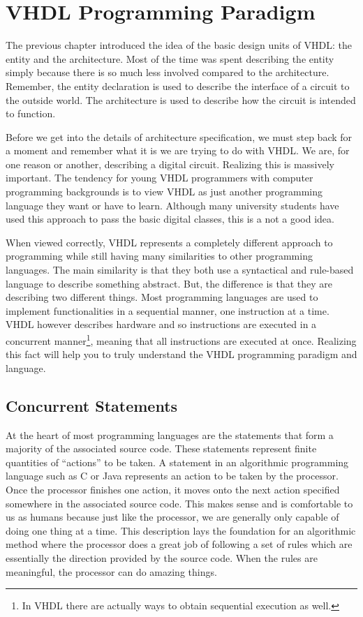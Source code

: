 %
%
%
\chapter{VHDL Programming Paradigm}
The previous chapter introduced the idea of the basic design units of VHDL: the entity and the architecture. Most of the time was spent describing the entity simply because there is so much less involved compared to the architecture. Remember, the entity declaration is used to describe the interface of a circuit to the outside world. The architecture is used to describe how the circuit is intended to function.

Before we get into the details of architecture specification, we must step back for a moment and remember what it is we are trying to do with VHDL. We are, for one reason or another, describing a digital circuit. Realizing this is massively important. The tendency for young VHDL programmers with computer programming backgrounds is to view VHDL as just another programming language they want or have to learn. Although many university students have used this approach to pass the basic digital classes, this is a not a good idea. 

When viewed correctly, VHDL represents a completely different approach to programming while still having many similarities to other programming languages. The main similarity is that they both use a syntactical and rule-based language to describe something abstract. But, the difference is that they are describing two different things. Most programming languages are used to implement functionalities in a sequential manner, one instruction at a time. VHDL however describes hardware and so instructions are executed in a concurrent manner\footnote{In VHDL there are actually ways to obtain sequential execution as well.}, meaning that all instructions are executed at once. Realizing this fact will help you to truly understand the VHDL programming paradigm and language.

\section{Concurrent Statements}
At the heart of most programming languages are the statements that form a majority of the associated source code. These statements represent finite quantities of ``actions'' to be taken. A statement in an algorithmic programming language such as C or Java represents an action to be taken by the processor. Once the processor finishes one action, it moves onto the next action specified somewhere in the associated source code. This makes sense and is comfortable to us as humans because just like the processor, we are generally only capable of doing one thing at a time. This description lays the foundation for an algorithmic method where the processor does a great job of following a set of rules which are essentially the direction provided by the source code. When the rules are meaningful, the processor can do amazing things. 

